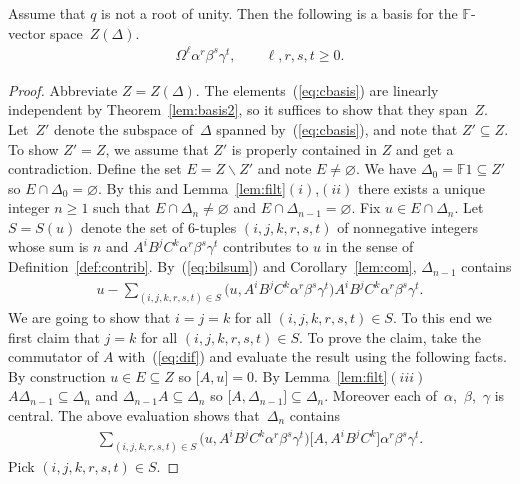 \begin{Theorem}
\label{thm:centerbasis}
Assume that $q$ is not a root of unity. Then the following is a basis for
the $\mathbb F$-vector space~$Z(\Delta)$.
\begin{gather}
\Omega^\ell \alpha^r \beta^s\gamma^t, \qquad  \ell,r,s,t \geq 0.
\label{eq:cbasis}
\end{gather}
\end{Theorem}

\begin{proof}
Abbreviate $Z=Z(\Delta)$.
The elements~(\ref{eq:cbasis})
are linearly independent by
Theorem~\ref{lem:basis2},
so it suf\/f\/ices to
show that they span~$Z$.
Let~$Z'$ denote the subspace of~$\Delta$ spanned by~(\ref{eq:cbasis}), and note that
$Z' \subseteq Z$. To show
$Z'= Z$, we assume that $Z'$ is properly contained in
$Z$ and get a contradiction.
Def\/ine the set $E=Z\backslash Z'$
and note $E\not=\varnothing$.
We have
$\Delta_0=\mathbb F 1
\subseteq Z'$ so
$E \cap \Delta_0 =\varnothing$.
By this and
Lemma~\ref{lem:filt}$(i)$,$(ii)$ there exists a unique integer
$n\geq 1$ such that
$E\cap \Delta_n \not=\varnothing$ and
$E\cap \Delta_{n-1} =\varnothing$.
Fix $u \in E\cap \Delta_n$.
Let
$S=S(u)$ denote
the set of 6-tuples $(i,j,k,r,s,t)$ of nonnegative integers
whose sum is $n$ and
 $A^iB^jC^k\alpha^r\beta^s\gamma^t$
contributes to $u$ in
the sense of
Def\/inition~\ref{def:contrib}.
By~(\ref{eq:bilsum}) and Corollary~\ref{lem:com},
$\Delta_{n-1}$ contains
\begin{gather}
\label{eq:dif}
u- \sum_{(i,j,k,r,s,t) \in S}
\big( u,
A^iB^jC^k\alpha^r \beta^s \gamma^t \big)
A^iB^jC^k\alpha^r \beta^s \gamma^t.
\end{gather}
We are going to show that
$i=j=k$ for all
$(i,j,k,r,s,t) \in S$.
To this end
we f\/irst claim that $j=k$ for all
$(i,j,k,r,s,t) \in S$.
To prove the claim,
take the commutator of $A$ with~(\ref{eq:dif}) and evaluate the
result using the following facts.
By construction $u \in E \subseteq Z$
so
  $\lbrack A,u\rbrack=0$.
By Lemma~\ref{lem:filt}$(iii)$
$A\Delta_{n-1} \subseteq  \Delta_n $
and
$\Delta_{n-1}A \subseteq \Delta_n$
so
 $\lbrack A,\Delta_{n-1}\rbrack \subseteq \Delta_n$.
Moreover
 each of~$\alpha$,~$\beta$,~$\gamma$
 is central.
The above evaluation shows that~$\Delta_n$ contains
\begin{gather*}
\sum_{(i,j,k,r,s,t) \in S}
\big( u, A^iB^jC^k
\alpha^r \beta^s \gamma^t \big)
\big\lbrack A, A^iB^jC^k \big\rbrack
\alpha^r \beta^s \gamma^t.
\end{gather*}
Pick
$(i,j,k,r,s,t) \in S$.

\end{proof}
